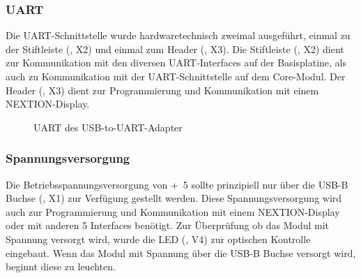 \subsubsection{UART}
Die UART-Schnittstelle wurde hardwaretechnisch zweimal ausgeführt, einmal zu der Stiftleiste (, X2) und einmal zum Header (, X3). Die Stiftleiste (, X2) dient zur Kommunikation mit den diversen UART-Interfaces auf der \gls{Basisplatine}, als auch zu Kommunikation mit der UART-Schnittstelle auf dem \gls{Core-Modul}. Der Header (, X3) dient zur Programmierung und Kommunikation mit einem NEXTION-Display.

\begin{figure}[htb]
    \centering
    \qquad
    \qquad
    \qquad
    \caption[UART des USB-to-UART-Adapter]{UART des \gls{USB-to-UART}-Adapter}
    \label{fig:usbtouart-uart}
\end{figure}

\subsubsection{Spannungsversorgung}
Die Betriebsspannungsversorgung von \unit{+5}{\volt} sollte prinzipiell nur über die USB-B Buchse (, X1) zur Verfügung gestellt werden. Diese Spannungsversorgung wird auch zur Programmierung und Kommunikation mit einem NEXTION-Display oder mit anderen \unit{5}{\volt} Interfaces benötigt. Zur Überprüfung ob das Modul mit Spannung versorgt wird, wurde die LED (, V4) zur optischen Kontrolle eingebaut. Wenn das Modul mit Spannung über die USB-B Buchse versorgt wird, beginnt diese zu leuchten.

